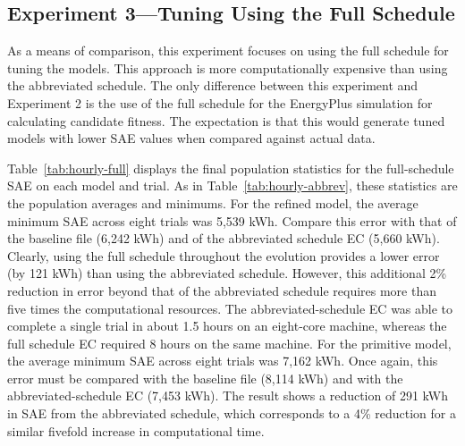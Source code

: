 \documentclass[preprint, review, 12pt]{elsarticle}
\begin{document}
{\subsection{Experiment 3---Tuning Using the Full Schedule}
\label{sub:experiment3}
As a means of comparison, this experiment focuses on using the full schedule for tuning the models. This approach is more computationally expensive than using the abbreviated schedule. The only difference between this experiment and Experiment 2 is the use of the full schedule for the EnergyPlus simulation for calculating candidate fitness. The expectation is that this would generate tuned models with lower SAE values when compared against actual data.

Table~\ref{tab:hourly-full} displays the final population statistics for the full-schedule SAE on each model and trial. As in Table~\ref{tab:hourly-abbrev}, these statistics are the population averages and minimums. For the refined model, the average minimum SAE across eight trials was 5,539 kWh. Compare this error with that of the baseline file (6,242 kWh) and of the abbreviated schedule EC (5,660 kWh). Clearly, using the full schedule throughout the evolution provides a lower error (by 121 kWh) than using the abbreviated schedule. However, this additional 2\% reduction in error beyond that of the abbreviated schedule requires more than five times the computational resources. The abbreviated-schedule EC was able to complete a single trial in about 1.5 hours on an eight-core machine, whereas the full schedule EC required 8 hours on the same machine. For the primitive model, the average minimum SAE across eight trials was 7,162 kWh. Once again, this error must be compared with the baseline file (8,114 kWh) and with the abbreviated-schedule EC (7,453 kWh). The result shows a reduction of 291 kWh in SAE from the abbreviated schedule, which corresponds to a 4\% reduction for a similar fivefold increase in computational time.

}
\end{document}

